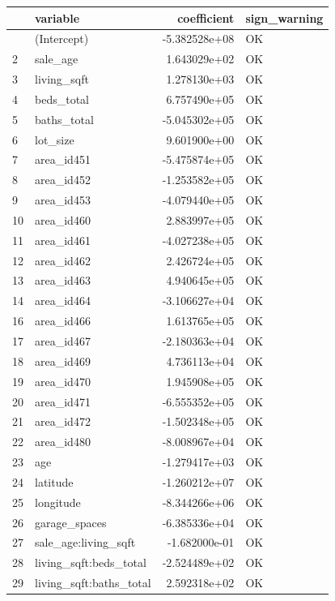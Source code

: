 \documentclass[
]{article}
\begin{document}
{\def\LTcaptype{} %
\begin{longtable}[]{@{}llrl@{}}
\toprule\noalign{}
& variable & coefficient & sign\_warning \\
\midrule\noalign{}
\endhead
\bottomrule\noalign{}
\endlastfoot
1 & (Intercept) & -5.382528e+08 & OK \\
2 & sale\_age & 1.643029e+02 & OK \\
3 & living\_sqft & 1.278130e+03 & OK \\
4 & beds\_total & 6.757490e+05 & OK \\
5 & baths\_total & -5.045302e+05 & OK \\
6 & lot\_size & 9.601900e+00 & OK \\
7 & area\_id451 & -5.475874e+05 & OK \\
8 & area\_id452 & -1.253582e+05 & OK \\
9 & area\_id453 & -4.079440e+05 & OK \\
10 & area\_id460 & 2.883997e+05 & OK \\
11 & area\_id461 & -4.027238e+05 & OK \\
12 & area\_id462 & 2.426724e+05 & OK \\
13 & area\_id463 & 4.940645e+05 & OK \\
14 & area\_id464 & -3.106627e+04 & OK \\
16 & area\_id466 & 1.613765e+05 & OK \\
17 & area\_id467 & -2.180363e+04 & OK \\
18 & area\_id469 & 4.736113e+04 & OK \\
19 & area\_id470 & 1.945908e+05 & OK \\
20 & area\_id471 & -6.555352e+05 & OK \\
21 & area\_id472 & -1.502348e+05 & OK \\
22 & area\_id480 & -8.008967e+04 & OK \\
23 & age & -1.279417e+03 & OK \\
24 & latitude & -1.260212e+07 & OK \\
25 & longitude & -8.344266e+06 & OK \\
26 & garage\_spaces & -6.385336e+04 & OK \\
27 & sale\_age:living\_sqft & -1.682000e-01 & OK \\
28 & living\_sqft:beds\_total & -2.524489e+02 & OK \\
29 & living\_sqft:baths\_total & 2.592318e+02 & OK \\
\end{longtable}
}
\end{document}
